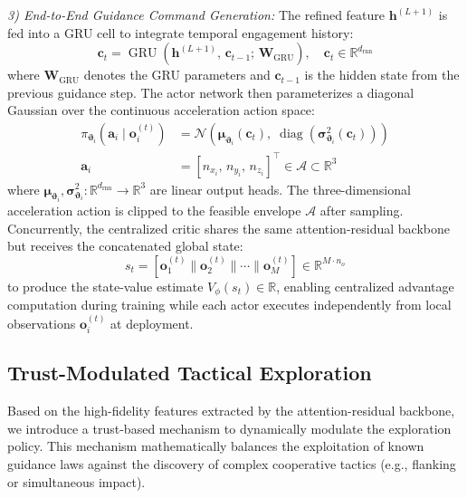 \documentclass[lettersize,journal]{IEEEtran}
\newcommand{\hladd}[1]{{\color{blue}#1}}
\begin{document}
\emph{3) End-to-End Guidance Command Generation:} The refined feature $\mathbf{h}^{(L+1)}$ is fed into a GRU cell to integrate temporal engagement history:
\begin{equation}
\label{eq:gru}
\mathbf{c}_t = \operatorname{GRU}\!\left(\mathbf{h}^{(L+1)},\, \mathbf{c}_{t-1};\, \mathbf{W}_{\mathrm{GRU}}\right), \quad \mathbf{c}_t \in \mathbb{R}^{d_{\mathrm{rnn}}}
\end{equation}
where $\mathbf{W}_{\mathrm{GRU}}$ denotes the GRU parameters and $\mathbf{c}_{t-1}$ is the hidden state from the previous guidance step. The actor network then parameterizes a diagonal Gaussian over the \hladd{continuous acceleration action space}:
\begin{equation}
\label{eq:actor_dist}
\begin{split}
\pi_{\boldsymbol{\vartheta}_i}\!\left(\mathbf{a}_i \mid \mathbf{o}_i^{(t)}\right) &= \mathcal{N}\!\left(\boldsymbol{\mu}_{\boldsymbol{\vartheta}_i}(\mathbf{c}_t),\; \operatorname{diag}\!\left(\boldsymbol{\sigma}_{\boldsymbol{\vartheta}_i}^2(\mathbf{c}_t)\right)\right) \\
\mathbf{a}_i &= [n_{x_i},\,n_{y_i},\,n_{z_i}]^\top \in \mathcal{A}\subset\mathbb{R}^3
\end{split}
\end{equation}
where \hladd{$\boldsymbol{\mu}_{\boldsymbol{\vartheta}_i}, \boldsymbol{\sigma}_{\boldsymbol{\vartheta}_i}^2: \mathbb{R}^{d_{\mathrm{rnn}}} \to \mathbb{R}^3$} are linear output heads. The \hladd{three-dimensional acceleration action} is clipped to the feasible envelope $\mathcal{A}$ after sampling. Concurrently, the centralized critic shares the same attention-residual backbone but receives the concatenated global state:
\begin{equation}
\label{eq:critic_input}
s_t = \left[\mathbf{o}_1^{(t)} \| \mathbf{o}_2^{(t)} \| \cdots \| \mathbf{o}_M^{(t)}\right] \in \mathbb{R}^{M \cdot n_o}
\end{equation}
to produce the state-value estimate $V_\phi(s_t) \in \mathbb{R}$, enabling centralized advantage computation during training while each actor executes independently from local observations $\mathbf{o}_i^{(t)}$ at deployment.

\subsection{Trust-Modulated Tactical Exploration}
\label{subsec:trust_exploration}

Based on the high-fidelity features extracted by the attention-residual backbone, we introduce a trust-based mechanism to dynamically modulate the exploration policy. This mechanism mathematically balances the exploitation of known guidance laws against the discovery of complex cooperative tactics (e.g., flanking or simultaneous impact).
\end{document}
